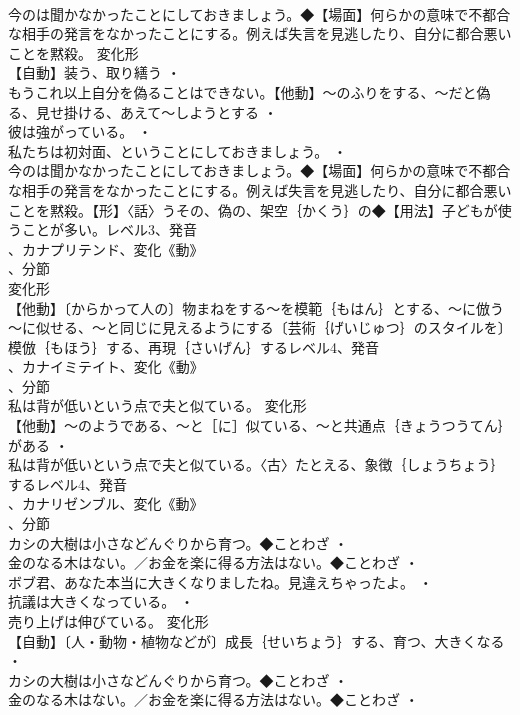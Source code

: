 \documentclass[8pt]{extreport}
\begin{document}
\begin{CJK}{UTF8}{min}
\\	今のは聞かなかったことにしておきましょう。◆【場面】何らかの意味で不都合な相手の発言をなかったことにする。例えば失言を見逃したり、自分に都合悪いことを黙殺。	変化形 
\\	【自動】装う、取り繕う ・
\\	もうこれ以上自分を偽ることはできない。【他動】～のふりをする、～だと偽る、見せ掛ける、あえて～しようとする ・
\\	彼は強がっている。 ・
\\	私たちは初対面、ということにしておきましょう。 ・
\\	今のは聞かなかったことにしておきましょう。◆【場面】何らかの意味で不都合な相手の発言をなかったことにする。例えば失言を見逃したり、自分に都合悪いことを黙殺。【形】〈話〉うその、偽の、架空｛かくう｝の◆【用法】子どもが使うことが多い。レベル3、発音
\\	、カナプリテンド、変化《動》
\\	、分節
\\	変化形 
\\	【他動】〔からかって人の〕物まねをする～を模範｛もはん｝とする、～に倣う～に似せる、～と同じに見えるようにする〔芸術｛げいじゅつ｝のスタイルを〕模倣｛もほう｝する、再現｛さいげん｝するレベル4、発音
\\	、カナイミテイト、変化《動》
\\	、分節
\\	私は背が低いという点で夫と似ている。	変化形 
\\	【他動】～のようである、～と［に］似ている、～と共通点｛きょうつうてん｝がある ・
\\	私は背が低いという点で夫と似ている。〈古〉たとえる、象徴｛しょうちょう｝するレベル4、発音
\\	、カナリゼンブル、変化《動》
\\	、分節
\\	カシの大樹は小さなどんぐりから育つ。◆ことわざ ・
\\	金のなる木はない。／お金を楽に得る方法はない。◆ことわざ ・
\\	ボブ君、あなた本当に大きくなりましたね。見違えちゃったよ。 ・
\\	抗議は大きくなっている。 ・
\\	売り上げは伸びている。	変化形 
\\	【自動】〔人・動物・植物などが〕成長｛せいちょう｝する、育つ、大きくなる ・
\\	カシの大樹は小さなどんぐりから育つ。◆ことわざ ・
\\	金のなる木はない。／お金を楽に得る方法はない。◆ことわざ ・

\end{CJK}
\end{document}
